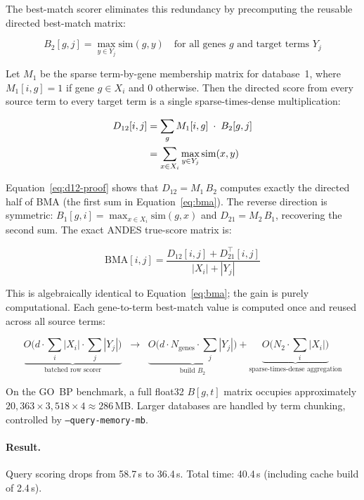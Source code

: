 \documentclass[11pt,a4paper]{article}
\begin{document}
The best-match scorer eliminates this redundancy by precomputing the reusable
directed best-match matrix:

\[
	B_2[g, j] = \max_{y \in Y_j} \mathrm{sim}(g, y) \quad
	\text{for all genes } g \text{ and target terms } Y_j
\]

Let $M_1$ be the sparse term-by-gene membership matrix for database~1, where
$M_1[i,g] = 1$ if gene $g \in X_i$ and 0 otherwise. Then the directed score
from every source term to every target term is a single sparse-times-dense
multiplication:

\begin{align}
	D_{12}[i,j]
	 & = \sum_g M_1[i,g] \;\cdot\; B_2[g,j] \notag           \\
	 & = \sum_{x \in X_i} \max_{y \in Y_j} \mathrm{sim}(x,y)
	\label{eq:d12-proof}
\end{align}

Equation~\ref{eq:d12-proof} shows that $D_{12} = M_1 \, B_2$ computes
exactly the directed half of BMA (the first sum in Equation~\ref{eq:bma}).
The reverse direction is symmetric: $B_1[g, i] = \max_{x \in X_i}
	\mathrm{sim}(g, x)$ and $D_{21} = M_2 \, B_1$, recovering the second sum.
The exact ANDES true-score matrix is:

\begin{equation}
	\label{eq:bestmatch}
	\mathrm{BMA}[i,j] = \frac{D_{12}[i,j] + D_{21}^\top[i,j]}{|X_i| + |Y_j|}
\end{equation}

This is algebraically identical to Equation~\ref{eq:bma}; the gain is
purely computational. Each gene-to-term best-match value is computed once and
reused across all source terms:

\[
	\underbrace{O\!\bigl(d \cdot \textstyle\sum_i |X_i| \cdot
		\textstyle\sum_j |Y_j|\bigr)}_{\text{batched row scorer}}
	\;\;\longrightarrow\;\;
	\underbrace{O\!\bigl(d \cdot N_\text{genes} \cdot
		\textstyle\sum_j |Y_j|\bigr)}_{\text{build }B_2}
	+
	\underbrace{O\!\bigl(N_2 \cdot \textstyle\sum_i |X_i|\bigr)}_{\text{sparse-times-dense aggregation}}
\]

On the GO~BP benchmark, a full float32 $B[g,t]$ matrix occupies approximately
$20{,}363 \times 3{,}518 \times 4 \approx 286$\,MB. Larger databases are
handled by term chunking, controlled by \texttt{--query-memory-mb}.

\paragraph{Result.}
Query scoring drops from 58.7\,s to 36.4\,s. Total time: 40.4\,s (including
cache build of 2.4\,s).
\end{document}
